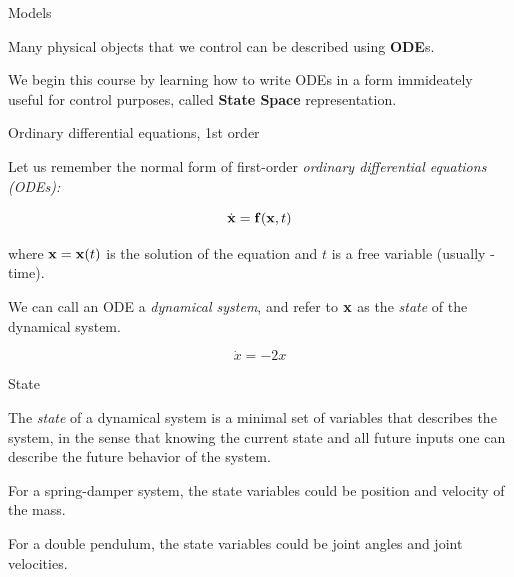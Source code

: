 \documentclass{beamer}
\begin{document}
\begin{frame}{Models}
	\begin{flushleft}
		
		Many physical objects that we control can be described using \textbf{ODE}s.
		
		\bigskip 
		
		We begin this course by learning how to write ODEs in a form immideately useful for control purposes, called \textbf{State Space} representation.
		
	\end{flushleft}
\end{frame}



\begin{frame}{Ordinary differential equations, 1st order}
\begin{flushleft}

Let us remember the normal form of first-order \emph{ordinary differential equations (ODEs):}

\begin{equation}
    \dot{\mathbf{x}} = \mathbf{f} (\mathbf{x}, t)
\end{equation}

where $\mathbf{x} = \mathbf{x}(t)$ is the solution of the equation and $t$ is a free variable (usually - time).

\bigskip

\begin{definition}
We can call an ODE a \emph{dynamical system}, and refer to $\mathbf{x}$ as the \emph{state} of the dynamical system.  
\end{definition}

\begin{example}
\begin{equation}
    \dot{x} = -2 x
\end{equation}
\end{example}

\end{flushleft}
\end{frame}




\begin{frame}{State}
	\begin{flushleft}
		
		The \emph{state} of a dynamical system is a minimal set of variables that describes the system, in the sense that knowing the current state and all future inputs one can describe the future behavior of the system.
		
		\begin{example}
			For a spring-damper system, the state variables could be position and velocity of the mass.
		\end{example} 
		\begin{example}
			For a double pendulum, the state variables could be joint angles and joint velocities.
		\end{example} 
		
	\end{flushleft}
\end{frame}
\end{document}
